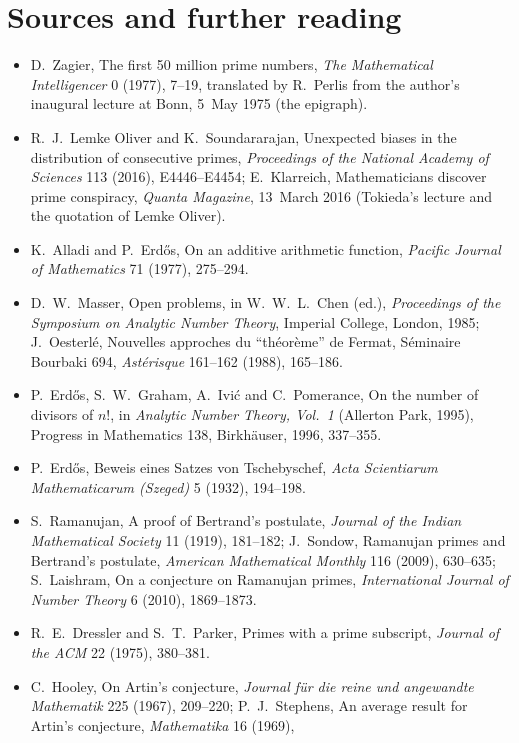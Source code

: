 \section*{Sources and further reading}

\begin{itemize}
\item D.~Zagier, The first 50 million prime numbers, \emph{The Mathematical Intelligencer} 0 (1977), 7--19, translated by R.~Perlis from the author's inaugural lecture at Bonn, 5~May 1975 (the epigraph).
\item R.~J.~Lemke Oliver and K.~Soundararajan, Unexpected biases in the distribution of consecutive primes, \emph{Proceedings of the National Academy of Sciences} 113 (2016), E4446--E4454;
E.~Klarreich, Mathematicians discover prime conspiracy, \emph{Quanta Magazine}, 13~March 2016 (Tokieda's lecture and the quotation of Lemke Oliver).
\item K.~Alladi and P.~Erd\H os, On an additive arithmetic function, \emph{Pacific Journal of Mathematics} 71 (1977), 275--294.
\item D.~W.~Masser, Open problems, in W.~W.~L.~Chen (ed.), \emph{Proceedings of the Symposium on Analytic Number Theory}, Imperial College, London, 1985; J.~Oesterl\'e, Nouvelles approches du
``th\'eor\`eme'' de Fermat, S\'eminaire Bourbaki 694, \emph{Ast\'erisque} 161--162 (1988), 165--186.
\item P.~Erd\H os, S.~W.~Graham, A.~Ivi\'c and C.~Pomerance, On the number of divisors of $n!$, in \emph{Analytic Number Theory, Vol.~1} (Allerton Park, 1995), Progress in Mathematics 138,
Birkh\"auser, 1996, 337--355.
\item P.~Erd\H os, Beweis eines Satzes von Tschebyschef, \emph{Acta Scientiarum Mathematicarum (Szeged)} 5 (1932), 194--198.
\item S.~Ramanujan, A proof of Bertrand's postulate, \emph{Journal of the Indian Mathematical Society} 11 (1919), 181--182; J.~Sondow, Ramanujan primes and Bertrand's postulate, \emph{American
Mathematical Monthly} 116 (2009), 630--635; S.~Laishram, On a conjecture on Ramanujan primes, \emph{International Journal of Number Theory} 6 (2010), 1869--1873.
\item R.~E.~Dressler and S.~T.~Parker, Primes with a prime subscript, \emph{Journal of the ACM} 22 (1975), 380--381.
\item C.~Hooley, On Artin's conjecture, \emph{Journal f\"ur die reine und angewandte Mathematik} 225 (1967), 209--220; P.~J.~Stephens, An average result for Artin's conjecture, \emph{Mathematika} 16 (1969),

\end{itemize}
